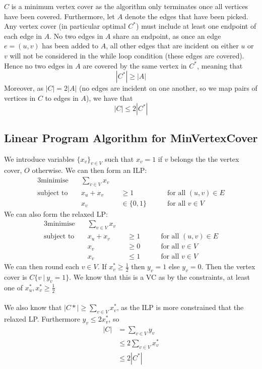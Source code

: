 \documentclass{article}
\theoremstyle{plain}
\theoremstyle{definition}
\begin{document}
    $C$ is a minimum vertex cover as the algorithm only terminates once all vertices have been covered. Furthermore, let $A$ denote the edges that have been picked. Any vertex cover (in particular optimal $C^*$) must include at least one endpoint of each edge in $A$. No two edges in $A$ share an endpoint, as once an edge $e = (u,v)$ has been added to $A$, all other edges that are incident on either $u$ or $v$  will not be considered in the while loop condition (these edges are covered). Hence no two edges in $A$ are covered by the same vertex in $C^*$, meaning that 
    \[ |C^*| \geq |A| \]
    Moreover, as $|C| = 2|A|$ (no edges are incident on one another, so we map pairs of vertices in $C$ to edges in $A$), we have that
    \[ |C| \leq 2|C^*| \]
    \subsection{Linear Program Algorithm for MinVertexCover}
    We introduce variables $\{x_v\}_{v \in V}$ such that $x_v = 1$ if $v$ belongs the the vertex cover, $O$ otherwise. We can then form an ILP:
    \begin{alignat*}{3}
        \text{minimise}  &\quad \sum_{v \in V} x_v && \\
        \text{subject to} 
        &\quad x_u + x_v &&\geq 1 && \quad \text{ for all $(u,v) \in E$} \\
        &\quad x_v &&\in \{0,1\} && \quad \text{ for all $v \in V$}
    \end{alignat*}
    We can also form the relaxed LP:
    \begin{alignat*}{3}
        \text{minimise}  &\quad \sum_{v \in V} x_v && \\
        \text{subject to} 
        &\quad x_u + x_v &&\geq 1 && \quad \text{ for all $(u,v) \in E$} \\
        &\quad x_v &&\geq 0 && \quad \text{ for all $v \in V$} \\ 
        &\quad x_v &&\leq 1 && \quad \text{ for all $v \in V$}
    \end{alignat*}
    We can then round each $v \in V$. If $x_v^* \geq \frac{1}{2}$ then $y_v = 1$ else $y_v = 0$. Then the vertex cover is $C \{ v \ | \ y_v = 1 \}$. We know that this is a VC as by the constraints, at least one of $x_u^*, x_v^* \geq \frac{1}{2}$\\ \\
    We also know that $|C*| \geq \sum_{v \in V}x_v^*$, as the ILP is more constrained that the relaxed LP. Furthermore $y_v \leq 2x_v^*$, so 
    \begin{align*}
        |C| &= \sum_{v \in V} y_v \\
            &\leq 2 \sum_{v \in V} x_v^* \\
            &\leq 2 |C^*|
    \end{align*}
\end{document}
